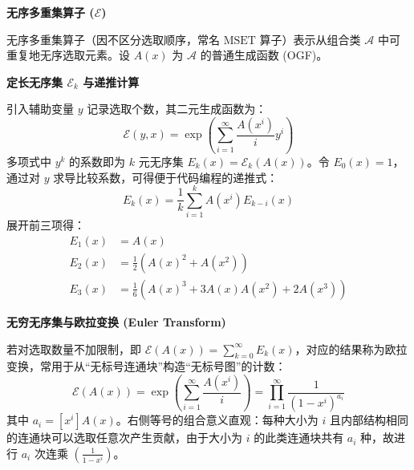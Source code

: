 \textbf{无序多重集算子 (\(\mathcal{E}\))}

无序多重集算子（因不区分选取顺序，常名 $\text{MSET}$ 算子）表示从组合类 $\mathcal{A}$ 中可重复地无序选取元素。设 $A(x)$ 为 $\mathcal{A}$ 的普通生成函数 (OGF)。

\textbf{定长无序集 $\mathcal{E}_k$ 与递推计算}

引入辅助变量 $y$ 记录选取个数，其二元生成函数为：
\[
\mathcal{E}(y, x) = \exp\left( \sum_{i=1}^\infty \frac{A(x^i)}{i} y^i \right)
\]
多项式中 $y^k$ 的系数即为 $k$ 元无序集 $E_k(x) = \mathcal{E}_k(A(x))$。令 $E_0(x)=1$，通过对 $y$ 求导比较系数，可得便于代码编程的递推式：
\[
E_k(x) = \frac{1}{k} \sum_{i=1}^k A(x^i) E_{k-i}(x)
\]
展开前三项得：
\begin{align*}
E_1(x) &= A(x) \\
E_2(x) &= \frac{1}{2}\left( A(x)^2 + A(x^2) \right) \\
E_3(x) &= \frac{1}{6}\left( A(x)^3 + 3A(x)A(x^2) + 2A(x^3) \right)
\end{align*}

\textbf{无穷无序集与欧拉变换 (Euler Transform)}

若对选取数量不加限制，即 $\mathcal{E}(A(x)) = \sum_{k=0}^\infty E_k(x)$，对应的结果称为欧拉变换，常用于从“无标号连通块”构造“无标号图”的计数：
\[
\mathcal{E}(A(x)) = \exp\left( \sum_{i=1}^\infty \frac{A(x^i)}{i} \right) = \prod_{i=1}^\infty \frac{1}{(1-x^i)^{a_i}}
\]
其中 $a_i = [x^i]A(x)$。右侧等号的组合意义直观：每种大小为 $i$ 且内部结构相同的连通块可以选取任意次产生贡献，由于大小为 $i$ 的此类连通块共有 $a_i$ 种，故进行 $a_i$ 次连乘 $\left(\frac{1}{1-x^i}\right)$。
